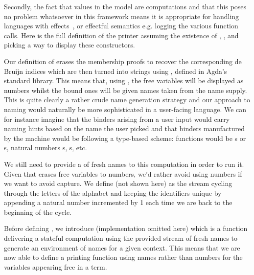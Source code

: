 
Secondly, the fact that values in the model are computations and that this
poses no problem whatsoever in this framework means it is appropriate for
handling languages with effects~\cite{moggi1991notions}, or effectful
semantics e.g. logging the various function calls. Here is the full definition
of the printer assuming the existence of , , and
 picking a way to display these constructors.


Our definition of  erases the membership proofs to
recover the corresponding de Bruijn indices which are then turned
into strings using , defined in Agda's standard library.
This means that, using  , the free
variables will be displayed as numbers whilst the bound ones will
be given names taken from the name supply. This is quite clearly
a rather crude name generation strategy and our approach to naming
would naturally be more sophisticated in a user-facing language.
We can for instance imagine that the binders arising from a user
input would carry naming hints based on the name the user picked
and that binders manufactured by the machine would be following
a type-based scheme: functions would be s or s, natural
numbers s, s, etc.


We still need to provide a  of fresh
names to this computation in order to run it. Given that  erases
free variables to numbers, we'd rather avoid using numbers if we want to
avoid capture. We define  (not shown here) as the stream
cycling through the letters of the alphabet and keeping the identifiers
unique by appending a natural number incremented by 1 each time we are
back to the beginning of the cycle.

Before defining , we introduce  (implementation
omitted here) which is a function delivering a stateful computation using
the provided stream of fresh names to generate an environment of names
for a given context. This means that we are now able to define a printing
function using names rather than numbers for the variables appearing free
in a term.

